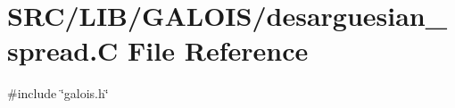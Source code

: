 \hypertarget{_l_i_b_2_g_a_l_o_i_s_2desarguesian__spread_8_c}{}\section{S\+R\+C/\+L\+I\+B/\+G\+A\+L\+O\+I\+S/desarguesian\+\_\+spread.C File Reference}
\label{_l_i_b_2_g_a_l_o_i_s_2desarguesian__spread_8_c}
{\ttfamily \#include \char`\"{}galois.\+h\char`\"{}}\newline
